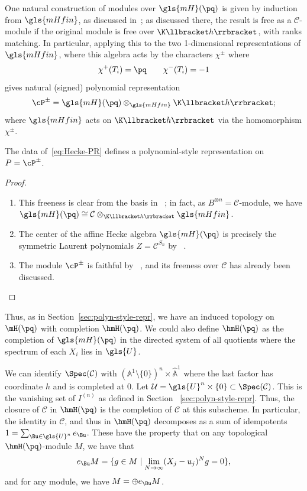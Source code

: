 One natural construction of modules over $\gls{mH}(\pq)$ is given by
induction from $\gls{mHfin} $, as discussed in~\cite[\S~4.3]{MacHecke}; as discussed there, the result is free as a
$\mathcal{C}$-module if the original module is free over $\K\llbracket h\rrbracket $,
with ranks matching. In particular, applying this to the two 1-dimensional
representations of $\gls{mHfin}$, where this algebra acts by the
characters $\chi^\pm$ where
\[ \chi^+(T_i)=\pq\qquad \chi^-(T_i)=-1\] gives natural (signed) polynomial
representation \[\cP^\pm=\gls{mH}(\pq)\otimes_{\gls{mHfin}}\K\llbracket h\rrbracket ;\] where
$\gls{mHfin}$ acts on $\K\llbracket h\rrbracket $ via the homomorphism $\chi^\pm$.
\begin{lemma}
 The data of~\eqref{eq:Hecke-PR} defines a polynomial-style
 representation on $P=\cP^{\pm}$. 
\end{lemma}
\begin{proof}\mbox{}
 \begin{enumerate}
 \item This freeness is clear from the basis in
~\cite[4.3]{MacBourbaki}; in fact, as
 $B^{\otimes n}=\mathcal{C}$-module, we have
 $\gls{mH}(\pq)\cong \mathcal{C}\otimes_{\K\llbracket h\rrbracket }\gls{mHfin} $. 
 \item The center of the affine Hecke algebra $\gls{mH}(\pq)$ is precisely
 the symmetric Laurent polynomials $Z=\mathcal{C}^{S_n}$ by
~\cite[4.5]{MacBourbaki}.
 \item The module $\cP^{\pm}$ is faithful by
~\cite[(4.3.10)]{MacHecke}, and its freeness over $\mathcal{C}$
 has already been discussed.\qedhere
 \end{enumerate}
\end{proof}


Thus, as in Section~\ref{sec:polyn-style-repr}, we have an induced
topology on $\mH(\pq)$ with completion $\hmH(\pq)$. We could also
define $\hmH(\pq)$ as the completion of
$\gls{mH}(\pq)$ in the directed system of all quotients where the spectrum of
each $X_i$ lies in $\gls{U}$. 

We can
identify $\Spec(\mathcal{C})$ with $(\mathbb{A}^1\setminus
\{0\})^n\times \widehat{\mathbb{A}}^1$ where the last factor has coordinate
$h$ and is completed at $0$. 
 Let $\mathcal{U}=\gls{U}^n\times \{0\}\subset \Spec(\mathcal{C})$. This
 is the vanishing set of $I^{(n)}$ as defined in Section
~\ref{sec:polyn-style-repr}. Thus, the closure of $\mathcal{C}$ in
 $\hmH(\pq)$ is the completion of $\mathcal{C}$ at this subscheme. In
 particular, the identity in $\mathcal{C}$, and thus in $\hmH(\pq)$
 decomposes as a sum of idempotents $1=\sum_{\Bu\in \gls{U}^n}e_{\Bu}$. These have the
 property that on any topological $\hmH(\pq)$-module $M$, we have that 
\[e_{\Bu}M=\{ g\in M \mid\lim_{N\to \infty}
 (X_j-{u_j})^Ng=0\},\]
and for any module, we have $M=\oplus e_{\Bu}M$. 

